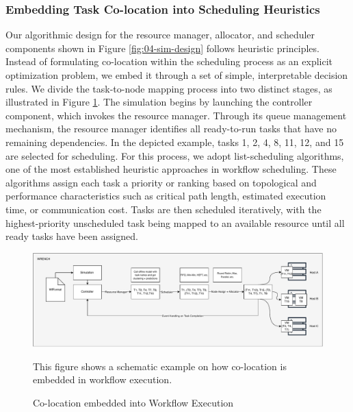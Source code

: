 \subsubsection{Embedding Task Co-location into Scheduling Heuristics}
\label{sec:heuristic_design}

Our algorithmic design for the resource manager, allocator, and scheduler components shown in Figure \ref{fig:04-sim-design} follows heuristic principles. Instead of formulating co-location within the scheduling process as an explicit optimization problem, we embed it through a set of simple, interpretable decision rules. We divide the task-to-node mapping process into two distinct stages, as illustrated in Figure \ref{fig:04-coloc-problem}. The simulation begins by launching the controller component, which invokes the resource manager. Through its queue management mechanism, the resource manager identifies all ready-to-run tasks that have no remaining dependencies. In the depicted example, tasks 1, 2, 4, 8, 11, 12, and 15 are selected for scheduling. For this process, we adopt list-scheduling algorithms, one of the most established heuristic approaches in workflow scheduling. These algorithms assign each task a priority or ranking based on topological and performance characteristics such as critical path length, estimated execution time, or communication cost. Tasks are then scheduled iteratively, with the highest-priority unscheduled task being mapped to an available resource until all ready tasks have been assigned.

\begin{figure}[H]
    \centering
    \includegraphics[scale=0.45]{fig/04/04-coloc-problem.pdf}
    \small
    \caption{Co-location embedded into Workflow Execution}
    \label{fig:04-coloc-problem}
    \tiny
    This figure shows a schematic example on how co-location is embedded in workflow execution.
\end{figure}

